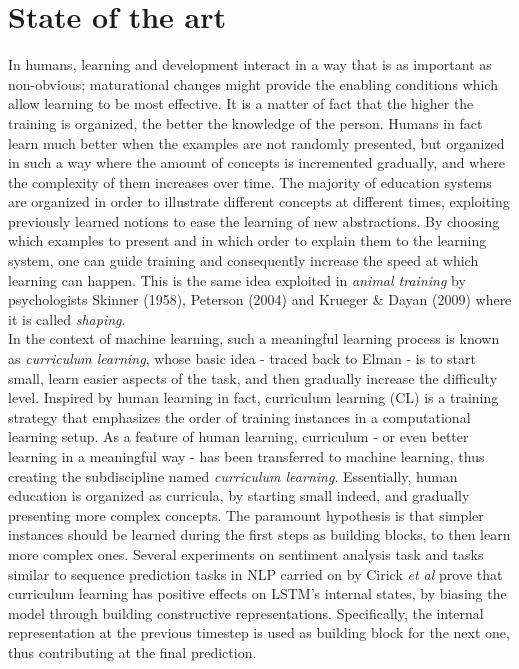 \section{State of the art}
In humans, learning and development interact in a way that is as important as non-obvious; maturational changes might provide the enabling 
conditions which allow learning to be most effective.
It is a matter of fact that the higher the training is organized, the better the knowledge of the person. Humans in fact learn much better when the examples are not randomly presented, but organized in such a way 
where the amount of concepts is incremented gradually, and where the complexity of them increases over time. The majority of education systems are organized in order to illustrate 
different concepts at different times, exploiting previously learned notions to ease the learning of new abstractions. By choosing which examples to present and in which order to explain them to the learning system, one can guide
training and consequently increase the speed at which learning can happen. This is the same idea exploited in \textit{animal training} by psychologists Skinner (1958), Peterson (2004) and Krueger \& Dayan (2009)
where it is called \textit{shaping}. \\
In the context of machine learning, such a meaningful learning process is known as \textit{curriculum learning}, whose basic idea - traced back to Elman - is to start small, learn easier aspects
of the task, and then gradually increase the difficulty level.
Inspired by human learning in fact, curriculum learning (CL) is a training strategy that emphasizes
the order of training instances in a computational learning setup.
As a feature of human learning, curriculum - or even better learning in a meaningful way -
has been transferred to machine learning, thus creating the subdiscipline named
\textit{curriculum learning}.
Essentially, human education is organized as curricula, by starting small indeed, and gradually presenting more complex
concepts. The paramount hypothesis is that simpler instances should be learned
during the first steps as building blocks, to then learn more complex ones. Several experiments on sentiment 
analysis task and tasks similar to sequence prediction tasks in NLP carried on by Cirick \textit{et al} \cite{Cirik2016VisualizingAU} prove that
curriculum learning has positive effects on LSTM's internal states, by biasing the model through building constructive representations. 
Specifically, the internal representation at the previous timestep is used as building block for the next one, thus
contributing at the final prediction.

